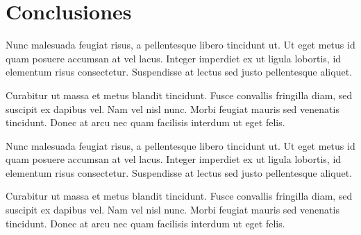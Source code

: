 \section{Conclusiones}

Nunc malesuada feugiat risus, a pellentesque libero tincidunt ut. Ut eget metus id quam posuere accumsan at vel lacus. Integer imperdiet ex ut ligula lobortis, id elementum risus consectetur. Suspendisse at lectus sed justo pellentesque aliquet.

Curabitur ut massa et metus blandit tincidunt. Fusce convallis fringilla diam, sed suscipit ex dapibus vel. Nam vel nisl nunc. Morbi feugiat mauris sed venenatis tincidunt. Donec at arcu nec quam facilisis interdum ut eget felis.

Nunc malesuada feugiat risus, a pellentesque libero tincidunt ut. Ut eget metus id quam posuere accumsan at vel lacus. Integer imperdiet ex ut ligula lobortis, id elementum risus consectetur. Suspendisse at lectus sed justo pellentesque aliquet.

Curabitur ut massa et metus blandit tincidunt. Fusce convallis fringilla diam, sed suscipit ex dapibus vel. Nam vel nisl nunc. Morbi feugiat mauris sed venenatis tincidunt. Donec at arcu nec quam facilisis interdum ut eget felis.

